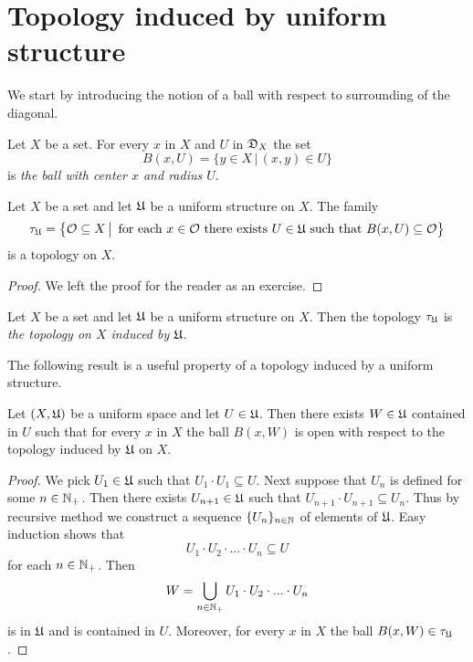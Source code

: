 \section{Topology induced by uniform structure}
\noindent
We start by introducing the notion of a ball with respect to surrounding of the diagonal.

\begin{definition}
Let $X$ be a set. For every $x$ in $X$ and $U$ in ${\mathfrak D}_X$ the set
$$B(x,U) = \big\{y\in X\,\big|\,(x,y)\in U\big\}$$
is \textit{the ball with center $x$ and radius $U$}.
\end{definition}

\begin{fact}\label{fact:topology_induced_by_uniform_structure}
Let $X$ be a set and let ${\mathfrak U}$ be a uniform structure on $X$. The family
$$\tau_{{\mathfrak U}} = \big\{{\mathcal O}\subseteq X\,\big|\,\mbox{ for each }x\in {\mathcal O}\mbox{ there exists }U\in {\mathfrak U}\mbox{ such that }B(x,U)\subseteq {\mathcal O}\big\}$$
is a topology on $X$.
\end{fact}
\begin{proof}
We left the proof for the reader as an exercise.
\end{proof}

\begin{definition}
Let $X$ be a set and let ${\mathfrak U}$ be a uniform structure on $X$. Then the topology $\tau_{{\mathfrak U}}$ is \textit{the topology on $X$ induced by ${\mathfrak U}$}.
\end{definition}
\noindent
The following result is a useful property of a topology induced by a uniform structure. 

\begin{proposition}\label{proposition:each_ball_contains_open_ball}
Let $(X,{\mathfrak U})$ be a uniform space and let $U \in {\mathfrak U}$. Then there exists $W \in {\mathfrak U}$ contained in $U$ such that for every $x$ in $X$ the ball $B(x,W)$ is open with respect to the topology induced by ${\mathfrak U}$ on $X$.
\end{proposition}
\begin{proof}
We pick $U_1 \in {\mathfrak U}$ such that $U_1\cdot U_1 \subseteq U$. Next suppose that $U_n$ is defined for some $n\in {\mathbb N}_+$. Then there exists $U_{n+1}\in {\mathfrak U}$ such that $U_{n+1}\cdot U_{n+1} \subseteq U_n$. Thus by recursive method we construct a sequence $\{U_n\}_{n\in {\mathbb N}}$ of elements of ${\mathfrak U}$. Easy induction shows that
$$U_1\cdot U_2\cdot ...\cdot U_n \subseteq U$$
for each $n\in {\mathbb N}_+$. Then
$$W = \bigcup_{n\in {\mathbb N}_+}U_{1}\cdot U_{2}\cdot ...\cdot U_{n}$$
is in ${\mathfrak U}$ and is contained in $U$. Moreover, for every $x$ in $X$ the ball $B(x,W) \in \tau_{{\mathfrak U}}$.
\end{proof}

